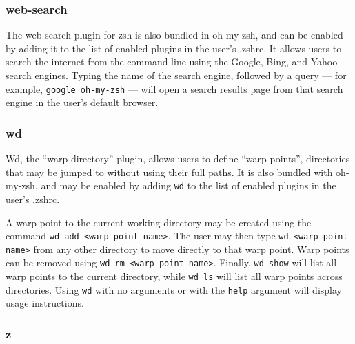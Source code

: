 \documentclass[12pt,a4paper]{article}
\begin{document}
			\subsubsection{web-search}

				The web-search plugin for zsh is also bundled in oh-my-zsh, and can be enabled by adding it to the list of enabled plugins in the user's .zshrc. It allows users to search the internet from the command line using the Google, Bing, and Yahoo search engines. Typing the name of the search engine, followed by a query --- for example, \lstinline{google oh-my-zsh} --- will open a search results page from that search engine in the user's default browser.

			\subsubsection{wd}

				Wd, the ``warp directory'' plugin, allows users to define ``warp points'', directories that may be jumped to without using their full paths. It is also bundled with oh-my-zsh, and may be enabled by adding \lstinline{wd} to the list of enabled plugins in the user's .zshrc.

				A warp point to the current working directory may be created using the command \lstinline{wd add <warp point name>}. The user may then type \lstinline{wd <warp point name>} from any other directory to move directly to that warp point. Warp points can be removed using \lstinline{wd rm <warp point name>}. Finally, \lstinline{wd show} will list all warp points to the current directory, while \lstinline{wd ls} will list all warp points across directories. Using \lstinline{wd} with no arguments or with the \lstinline{help} argument will display usage instructions.

			\subsubsection{z}
\end{document}
